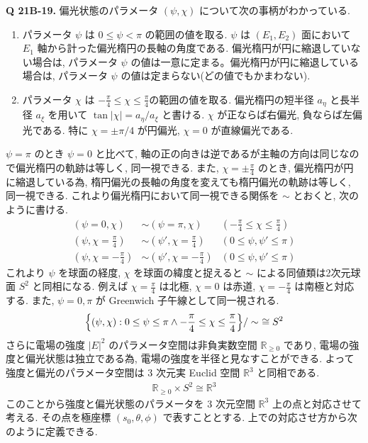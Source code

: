 \documentclass[uplatex,dvipdfmx,a4paper,11pt]{jlreq}
\newcommand{\RR}{\mathbb{R}}
\theoremstyle{definition}
\begin{document}
\textbf{Q 21B-19.}
偏光状態のパラメータ $(\psi, \chi)$ について次の事柄がわかっている.
\begin{enumerate}
  \item パラメータ $\psi$ は $0\leq\psi<\pi$ の範囲の値を取る. $\psi$ は $(E_1, E_2)$ 面において $E_1$ 軸から計った偏光楕円の長軸の角度である. 偏光楕円が円に縮退していない場合は, パラメータ $\psi$ の値は一意に定まる。偏光楕円が円に縮退している場合は, パラメータ $\psi$ の値は定まらない(どの値でもかまわない).
  \item  パラメータ $\chi$ は $-\frac{\pi}{4}\leq\chi\leq\frac{\pi}{4}$の範囲の値を取る. 偏光楕円の短半径 $a_\eta$ と長半径 $a_\xi$ を用いて $\tan|\chi| = a_\eta/a_\xi$ と書ける. $\chi$ が正ならば右偏光, 負ならば左偏光である. 特に $\chi = \pm \pi/4$ が円偏光, $\chi = 0$ が直線偏光である.
\end{enumerate}
$\psi = \pi$ のとき $\psi = 0$ と比べて, 軸の正の向きは逆であるが主軸の方向は同じなので偏光楕円の軌跡は等しく, 同一視できる. また, $\chi = \pm\frac{\pi}{4}$ のとき, 偏光楕円が円に縮退している為, 楕円偏光の長軸の角度を変えても楕円偏光の軌跡は等しく, 同一視できる. これより偏光楕円において同一視できる関係を $\sim$ とおくと, 次のように書ける.
\begin{align}
  (\psi = 0, \chi)              & \sim (\psi = \pi, \chi)             & (-\frac{\pi}{4}\leq\chi\leq\frac{\pi}{4}) \\
  (\psi, \chi = \frac{\pi}{4})  & \sim (\psi', \chi = \frac{\pi}{4})  & (0\leq\psi,\psi'\leq\pi)                  \\
  (\psi, \chi = -\frac{\pi}{4}) & \sim (\psi', \chi = -\frac{\pi}{4}) & (0\leq\psi,\psi'\leq\pi)
\end{align}
これより $\psi$ を球面の経度, $\chi$ を球面の緯度と捉えると $\sim$ による同値類は2次元球面 $S^2$ と同相になる. 例えば $\chi = \frac{\pi}{4}$ は北極, $\chi = 0$ は赤道, $\chi = -\frac{\pi}{4}$ は南極と対応する. また, $\psi = 0,\pi$ が Greenwich 子午線として同一視される.
\begin{align}
  \qty{(\psi, \chi):0\leq\psi\leq\pi \land -\frac{\pi}{4}\leq\chi\leq\frac{\pi}{4}}/\sim\ \cong S^2
\end{align}
さらに電場の強度 $|E|^2$ のパラメータ空間は非負実数空間 $\RR_{\geq0}$ であり, 電場の強度と偏光状態は独立である為, 電場の強度を半径と見なすことができる. よって強度と偏光のパラメータ空間は 3 次元実 Euclid 空間 $\RR^3$ と同相である.
\begin{align}
  \RR_{\geq 0}\times S^2 \cong \RR^3
\end{align}
このことから強度と偏光状態のパラメータを 3 次元空間 $\RR^3$ 上の点と対応させて考える. その点を極座標 $(s_0, \theta, \phi)$ で表すこととする. 上での対応させ方から次のように定義できる.
\end{document}

